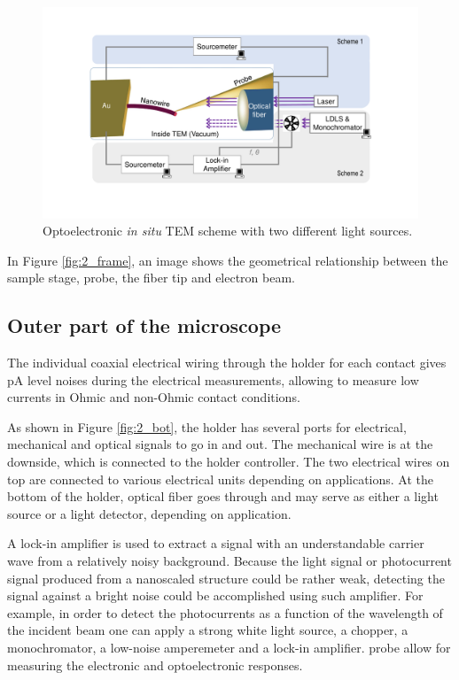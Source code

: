 \begin{figure}
\centering
\includegraphics[width=\textwidth]{figures/figure6_1}
\caption[Optoelectronic {\em in situ} TEM scheme]{Optoelectronic {\em in situ} TEM scheme with two different light sources. }
\label{fig:6_1}
\end{figure}

In Figure \ref{fig:2_frame}, an image shows the geometrical relationship between the sample stage, probe, the fiber tip and electron beam. 

\subsection{Outer part of the microscope}
The individual coaxial electrical wiring through the holder for each contact gives pA level noises during the electrical measurements, allowing to measure low currents in Ohmic and non-Ohmic contact conditions. 

As shown in Figure \ref{fig:2_bot}, the holder has several ports for electrical, mechanical and optical signals to go in and out. 
The mechanical wire is at the downside, which is connected to the holder controller. 
The two electrical wires on top are connected to various electrical units depending on applications. 
At the bottom of the holder, optical fiber goes through and may serve as either a light source or a light detector, depending on application. 

A lock-in amplifier is used to extract a signal with an understandable carrier wave from a relatively noisy background. 
Because the light signal or photocurrent signal produced from a nanoscaled structure could be rather weak, detecting the signal against a bright noise could be accomplished using such amplifier. 
For example, in order to detect the photocurrents as a function of the wavelength of the incident beam one can apply a strong white light source, a chopper, a monochromator, a low-noise amperemeter and a lock-in amplifier. 
probe allow for measuring the electronic and optoelectronic responses. 

